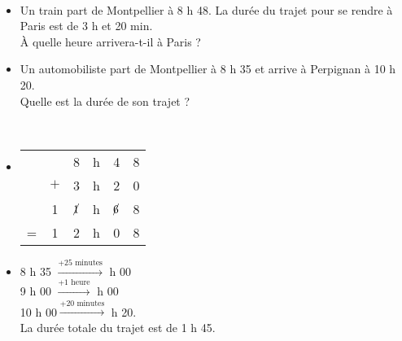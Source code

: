 \begin{exemple}
\ \\ [-10mm]
  \begin{itemize}
      \item Un train part de Montpellier à 8 h 48. La durée du trajet pour se rendre à Paris est de 3 h et 20 min. \\
      À quelle heure arrivera-t-il à Paris ?
      \item Un automobiliste part de Montpellier à 8 h 35 et arrive à Perpignan à 10 h 20. \\
   Quelle est la durée de son trajet ?
   \end{itemize}
\correction
\ \\ [-10mm]
   \begin{itemize}
      \item   
      \begin{tabular}{C{0.5}ccccc}
         & & 8 & h & 4 & 8 \\
         & $+$ & 3 & h & 2 & 0 \\
         \hline
         & 1 & $\cancel{1}$ & h & $\cancel{6}$ & 8 \\
         = & 1 & 2 & h & 0 & 8 \\
      \end{tabular}
      \item 8 h 35 \quad $\xrightarrow{+\text{25 minutes}}$  h 00 \\
      9 h 00 \quad $\xrightarrow{+\text{1 heure}}$  h 00 \\
      10 h 00\quad $\xrightarrow{+\text{20 minutes}}$  h 20. \\   
      La durée totale du trajet est de 1 h 45.
   \end{itemize}   
\end{exemple}


\exercicesbase

